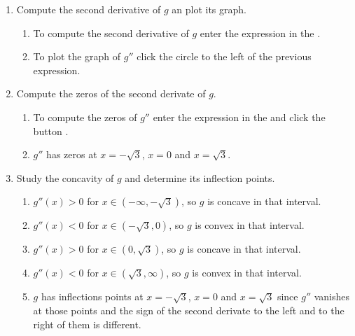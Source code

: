 \begin{enumerate}[leftmargin=*]
\begin{enumerate}
      \item Compute the second derivative of $g$ an plot its graph.
            \begin{indication}
            \begin{enumerate}
            \item To compute the second derivative of $g$ enter the expression  in the .
            \item To plot the graph of $g''$ click the circle to the left of the previous expression.
            \end{enumerate}
            \end{indication}

      \item Compute the zeros of the second derivate of $g$.
            \begin{indication}
            \begin{enumerate}
            \item To compute the zeros of $g''$ enter the expression  in the  and click the button .
            \item $g''$ has zeros at $x=-\sqrt{3}$, $x=0$ and $x=\sqrt{3}$.
            \end{enumerate}
            \end{indication}

      \item Study the concavity of $g$ and determine its inflection points.
            \begin{indication}
            \begin{enumerate}
            \item $g''(x)>0$ for $x\in (-\infty, -\sqrt{3})$, so $g$ is concave in that interval.
            \item $g''(x)<0$ for $x\in (-\sqrt{3}, 0)$, so $g$ is convex in that interval.
            \item $g''(x)>0$ for $x\in (0, \sqrt{3})$, so $g$ is concave in that interval.
            \item $g''(x)<0$ for $x\in (\sqrt{3}, \infty)$, so $g$ is convex in that interval.
            \item $g$ has inflections points at $x=-\sqrt{3}$, $x=0$ and $x=\sqrt{3}$ since $g''$ vanishes at those points and the sign of the second derivate to the left and to the right of them is different.
            \end{enumerate}
            \end{indication}
      \end{enumerate}

\end{enumerate}



